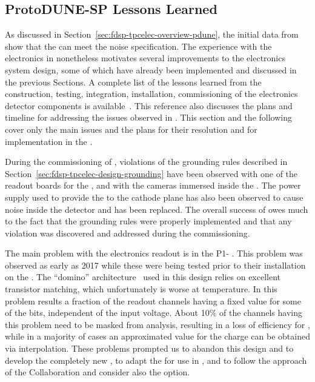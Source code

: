 \subsection{ProtoDUNE-SP Lessons Learned}
\label{sec:fdsp-tpcelec-overview-lessons}

As discussed in Section~\ref{sec:fdsp-tpcelec-overview-pdune}, the initial 
data from  show that the  can meet the noise specification. 
The experience with the  electronics in  nonetheless motivates 
several improvements to the  electronics system design, some of which
have already been implemented and discussed in the previous Sections.
A complete list of the lessons learned from the construction, testing, integration,
installation, commissioning of the  electronics detector components
is available~\cite{bib:docdb12367}. This reference also discusses
the plans and timeline for addressing the issues observed in . 
This  section and the following cover only the main issues 
and the plans for their resolution and for implementation in the . 

During the commissioning of , violations of the
grounding rules described in Section~\ref{sec:fdsp-tpcelec-design-grounding}
have been observed with one of the readout
boards for the , and with the cameras immersed
inside the \lar. The power supply used to provide the  to the 
cathode plane has also been observed
to cause noise inside the detector and has been replaced.
The overall success of  owes much to the fact that the
grounding rules were properly implemented
and that any violation was discovered and addressed during
the commissioning.

The main problem with the   electronics readout is in the
P1- . This problem was observed as early as 2017 
while these  were being tested prior to their installation
on the . The ``domino'' architecture~\cite{dominoADC} used in this design relies on
excellent transistor matching, which unfortunately 
is worse at  temperature. In  this problem
results a fraction of the readout channels having a fixed value for some of
the  bits, independent of the input voltage. About 10\%
of the channels having this problem need to be masked from analysis, 
resulting in a loss of efficiency for , 
while in a majority of cases an approximated value for the charge can
be obtained via interpolation. These problems prompted us to abandon
this design and to develop the completely new , to
adapt the   for use in , and to
follow the approach of the  Collaboration and consider
also the   option.

